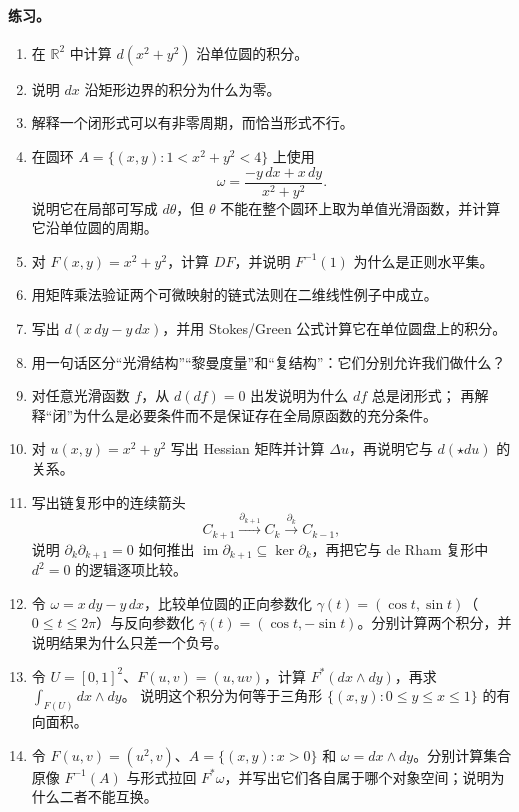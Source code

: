 \documentclass[UTF8,fontset=none,a4paper,11pt]{ctexart}
\theoremstyle{foundation-definition}
\theoremstyle{foundation-theorem}
\theoremstyle{foundation-proposition}
\theoremstyle{foundation-example}
\theoremstyle{foundation-remark}
\theoremstyle{foundation-theorem}
\begin{document}
\paragraph{练习。}
\begin{enumerate}[label=M5B.\arabic*.]
  \item 在 \(\mathbb R^2\) 中计算 \(d(x^2+y^2)\) 沿单位圆的积分。
  \item 说明 \(dx\) 沿矩形边界的积分为什么为零。
  \item 解释一个闭形式可以有非零周期，而恰当形式不行。
  \item 在圆环 \(A=\{(x,y):1< x^2+y^2<4\}\) 上使用
  \[
  \omega=\frac{-y\,dx+x\,dy}{x^2+y^2}.
  \]
  说明它在局部可写成 \(d\theta\)，但 \(\theta\) 不能在整个圆环上取为单值光滑函数，并计算它沿单位圆的周期。
  \item 对 \(F(x,y)=x^2+y^2\)，计算 \(DF\)，并说明 \(F^{-1}(1)\) 为什么是正则水平集。
  \item 用矩阵乘法验证两个可微映射的链式法则在二维线性例子中成立。
  \item 写出 \(d(x\,dy-y\,dx)\)，并用 Stokes/Green 公式计算它在单位圆盘上的积分。
  \item 用一句话区分“光滑结构”“黎曼度量”和“复结构”：它们分别允许我们做什么？
  \item 对任意光滑函数 \(f\)，从 \(d(df)=0\) 出发说明为什么 \(df\) 总是闭形式；
    再解释“闭”为什么是必要条件而不是保证存在全局原函数的充分条件。
  \item 对 \(u(x,y)=x^2+y^2\) 写出 Hessian 矩阵并计算 \(\Delta u\)，再说明它与
    \(d(\star du)\) 的关系。
  \item 写出链复形中的连续箭头
    \[
    C_{k+1}\xrightarrow{\partial_{k+1}}C_k
    \xrightarrow{\partial_k}C_{k-1},
    \]
    说明 \(\partial_k\partial_{k+1}=0\) 如何推出
    \(\operatorname{im}\partial_{k+1}\subseteq\ker\partial_k\)，再把它与
    de Rham 复形中 \(d^2=0\) 的逻辑逐项比较。
  \item 令 \(\omega=x\,dy-y\,dx\)，比较单位圆的正向参数化
    \(\gamma(t)=(\cos t,\sin t)\)（\(0\leq t\leq2\pi\)）与反向参数化
    \(\bar\gamma(t)=(\cos t,-\sin t)\)。分别计算两个积分，并说明结果为什么只差一个负号。
  \item 令 \(U=[0,1]^2\)、\(F(u,v)=(u,uv)\)，计算
    \(F^*(dx\wedge dy)\)，再求 \(\int_{F(U)}dx\wedge dy\)。
    说明这个积分为何等于三角形 \(\{(x,y):0\leq y\leq x\leq1\}\) 的有向面积。
  \item 令 \(F(u,v)=(u^2,v)\)、\(A=\{(x,y):x>0\}\) 和
    \(\omega=dx\wedge dy\)。分别计算集合原像 \(F^{-1}(A)\) 与形式拉回
    \(F^*\omega\)，并写出它们各自属于哪个对象空间；说明为什么二者不能互换。
\end{enumerate}
\end{document}
